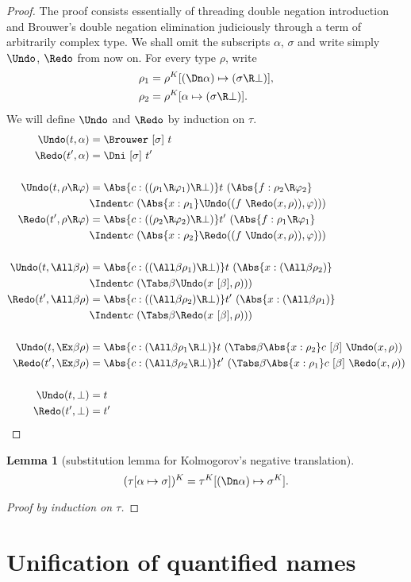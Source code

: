 \documentclass{amsart}
\let\phi=\varphi %
\newtheorem{lemma}[subsection]{Lemma}
\begin{document}
\begin{proof}
The proof consists essentially of threading double negation
introduction and Brouwer's double negation elimination
judiciously through a term of arbitrarily complex type. We shall
omit the subscripts $\alpha$, $\sigma$ and write simply $\Undo$,
$\Redo$ from now on. For every type $\rho$, write
\begin{align*}
\rho_1 & = \rho^K[(\Dn\alpha)\mapsto(\sigma\R\bot)],\\
\rho_2 & = \rho^K[\alpha\mapsto(\sigma\R\bot)].
\end{align*}
We will define $\Undo$ and $\Redo$ by induction on $\tau$.
\begin{align*}
\Undo(t,\alpha) & = \Brouwer~[\sigma]~t\\
\Redo(t',\alpha) & = \Dni~[\sigma]~t'\\
\\
\Undo(t,\rho\R\phi) & =
  \Abs{c : ((\rho_1 \R \phi_1) \R \bot)}
  t~(\Abs{f : \rho_2 \R \phi_2}\\
  &\Indent c~(\Abs{x : \rho_1}
  \Undo((f~\Redo(x, \rho)), \phi) ))\\
\Redo(t',\rho\R\phi) & =
  \Abs{c : ((\rho_2 \R \phi_2) \R \bot)}
  t'~(\Abs{f : \rho_1 \R \phi_1}\\
  &\Indent c~(\Abs{x : \rho_2}
  \Redo((f~\Undo(x, \rho)), \phi) ))\\
\\
\Undo(t, \All\beta \rho) & =
  \Abs{c : ((\All\beta \rho_1) \R \bot)}
  t~(\Abs{x : (\All\beta \rho_2)} \\
  &\Indent c~(\Tabs\beta \Undo(x~[\beta], \rho)) )\\
\Redo(t', \All\beta \rho) & =
  \Abs{c : ((\All\beta \rho_2) \R \bot)}
  t'~(\Abs{x : (\All\beta \rho_1)} \\
  &\Indent c~(\Tabs\beta \Redo(x~[\beta], \rho)) )\\
\\
\Undo(t, \Ex\beta \rho) & =
  \Abs{c : (\All\beta \rho_1 \R \bot)}
  t~(\Tabs\beta \Abs{x : \rho_2}
  c~[\beta]~\Undo(x,\rho) )\\
\Redo(t', \Ex\beta \rho) & =
  \Abs{c : (\All\beta \rho_2 \R \bot)}
  t'~(\Tabs\beta \Abs{x : \rho_1}
  c~[\beta]~\Redo(x,\rho) )\\
\\
\Undo(t,\bot) & = t \\
\Redo(t',\bot) & = t' \qedhere
\end{align*}
\end{proof}

\begin{lemma}
[substitution lemma for Kolmogorov's negative translation]
\label{lem:subst-kolmogorov}
\[
(\tau[\alpha\mapsto\sigma])^K =
\tau^K[(\Dn\alpha) \mapsto \sigma^K].
\]
\end{lemma}

\begin{proof}
[Proof by induction on $\tau$]
\end{proof}

\section{Unification of quantified names}
\label{sec:unify}
\end{document}
